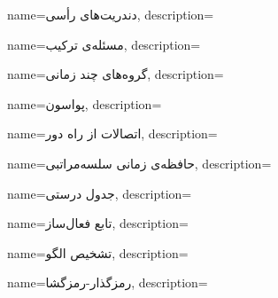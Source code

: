 {
name={دندریت‌های رأسی},
description=\hfill{}
}

{
	name={مسئله‌ی ترکیب},
	description=\hfill{}
}

{
name={گروه‌های چند زمانی},
description=\hfill{}
}


{
	name={پواسون},
	description=\hfill{}
}


{
	name={اتصالات از راه دور},
	description=\hfill{}
}

{
	name={حافظه‌ی زمانی سلسه‌مراتبی},
	description=\hfill{}
}

{
	name={جدول درستی},
	description=\hfill{}
}

{
	name={تابع فعال‌ساز},
	description=\hfill{}
}

{
	name={تشخیص الگو},
	description=\hfill{}
}


{
	name={رمزگذار-رمزگشا},
	description=\hfill{}
}


